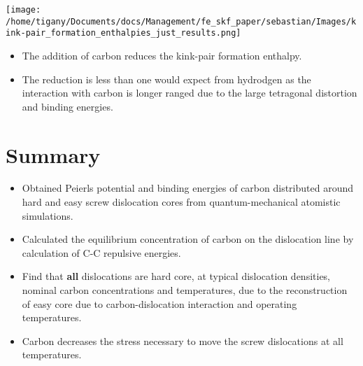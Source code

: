 \documentclass[11pt]{article}
\begin{document}
\begin{center}
\texttt{[image: /home/tigany/Documents/docs/Management/fe\_skf\_paper/sebastian/Images/kink-pair\_formation\_enthalpies\_just\_results.png]}
\end{center}

\begin{itemize}
\item The addition of carbon reduces the kink-pair formation enthalpy.
\item The reduction is less than one would expect from hydrodgen as the
interaction with carbon is longer ranged due to the large
tetragonal distortion and binding energies.
\end{itemize}

\section*{Summary}
\label{sec:orgdca35e9}
\begin{itemize}
\item Obtained Peierls potential and binding energies of carbon distributed around hard and easy screw
dislocation cores from quantum-mechanical atomistic simulations.
\item Calculated the equilibrium concentration of carbon on the
dislocation line by calculation of C-C repulsive energies.
\item Find that \textbf{all} dislocations are hard core, at typical dislocation densities,
nominal carbon concentrations and temperatures, due to the
reconstruction of easy core due to carbon-dislocation interaction
and operating temperatures.
\item Carbon decreases the stress necessary to move the screw
dislocations at all temperatures.
\end{itemize}
\end{document}
